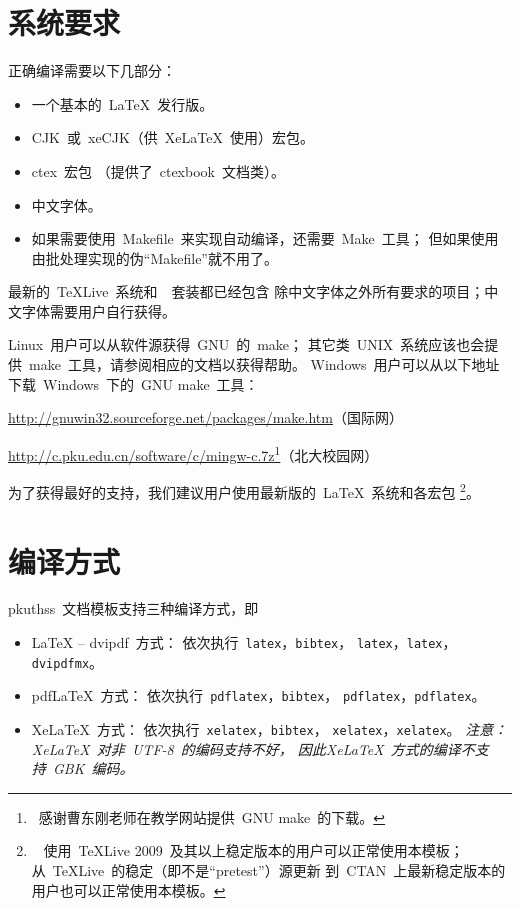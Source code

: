 	\section{系统要求}

	正确编译需要以下几部分：
	\begin{itemize}\denselist
		\item 一个基本的~\LaTeX{}~发行版。
		\item CJK~或~xeCJK（供~Xe\LaTeX{}~使用）宏包。
		\item ctex~宏包\supercite{ctex-doc,ctexfaq}%
			（提供了~ctexbook~文档类）。
		\item 中文字体。
		\item 如果需要使用~Makefile~来实现自动编译，还需要~Make~工具；
			但如果使用由批处理实现的伪“Makefile”就不用了。
	\end{itemize}

	最新的~\TeX{}Live~系统和~\CTeX~套装都已经包含%
	除中文字体之外所有要求的项目；中文字体需要用户自行获得。

	Linux~用户可以从软件源获得~GNU~的~make；
	其它类~UNIX~系统应该也会提供~make~工具，请参阅相应的文档以获得帮助。%
	Windows~用户可以从以下地址下载~Windows~下的~GNU make~工具：

	\url{http://gnuwin32.sourceforge.net/packages/make.htm}（国际网）
	\vspace{-0.1em}\par
	\url{http://c.pku.edu.cn/software/c/mingw-c.7z}\footnote%
	{\ 感谢曹东刚老师在教学网站提供~GNU make~的下载。}（北大校园网）

	为了获得最好的支持，我们建议用户使用最新版的~\LaTeX{}~系统和各宏包%
	\footnote%
	{\ %
		使用~\TeX{}Live 2009~及其以上稳定版本的用户可以正常使用本模板；
		从~\TeX{}Live~的稳定（即不是“pretest”）源更新%
		到~CTAN~上最新稳定版本的用户也可以正常使用本模板。
	}。

	\section{编译方式}

	pkuthss~文档模板支持三种编译方式，即
	\begin{itemize}\denselist
	  \item \LaTeX{} -- dvipdf~方式：
		依次执行~\verb|latex|，\verb|bibtex|，%
		\verb|latex|，\verb|latex|，\verb|dvipdfmx|。
	  \item pdf\LaTeX{}~方式：
		依次执行~\verb|pdflatex|，\verb|bibtex|，%
		\verb|pdflatex|，\verb|pdflatex|。
	  \item Xe\LaTeX{}~方式：
		依次执行~\verb|xelatex|，\verb|bibtex|，%
		\verb|xelatex|，\verb|xelatex|。%
		\emph
		{%
			注意：Xe\LaTeX{}~对非~UTF-8~的编码支持不好，
			因此Xe\LaTeX{}~方式的编译不支持~GBK~编码。
		}
	\end{itemize}

